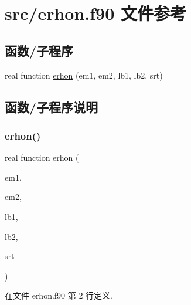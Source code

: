 \hypertarget{erhon_8f90}{}\section{src/erhon.f90 文件参考}
\label{erhon_8f90}
\subsection*{函数/子程序}
\begin{DoxyCompactItemize}
\item 
real function \mbox{\hyperlink{erhon_8f90_a217764fb6b7f1be79b168bf9d7a7040c}{erhon}} (em1, em2, lb1, lb2, srt)
\end{DoxyCompactItemize}


\subsection{函数/子程序说明}
\mbox{\label{erhon_8f90_a217764fb6b7f1be79b168bf9d7a7040c}} 
\subsubsection{\texorpdfstring{erhon()}{erhon()}}
{\footnotesize\ttfamily real function erhon (\begin{DoxyParamCaption}\item[{}]{em1,  }\item[{}]{em2,  }\item[{}]{lb1,  }\item[{}]{lb2,  }\item[{}]{srt }\end{DoxyParamCaption})}



在文件 erhon.\+f90 第 2 行定义.

